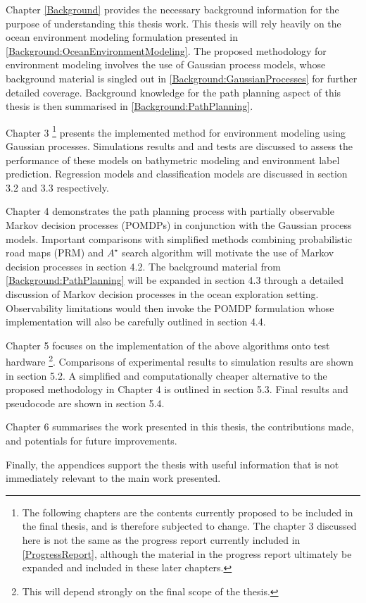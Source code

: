 		Chapter \ref{Background} provides the necessary background information for the purpose of understanding this thesis work. This thesis will rely heavily on the ocean environment modeling formulation presented in \cref{Background:OceanEnvironmentModeling}. The proposed methodology for environment modeling involves the use of Gaussian process models, whose background material is singled out in \cref{Background:GaussianProcesses} for further detailed coverage. Background knowledge for the path planning aspect of this thesis is then summarised in \cref{Background:PathPlanning}.
				
		Chapter {\color{BurntOrange} 3} \footnote{ {\color{BurntOrange} The following chapters are the contents currently proposed to be included in the final thesis, and is therefore subjected to change. The chapter 3 discussed here is not the same as the progress report currently included in \cref{ProgressReport}, although the material in the progress report ultimately be expanded and included in these later chapters.} } presents the implemented method for environment modeling using Gaussian processes. Simulations results and and tests are discussed to assess the performance of these models on bathymetric modeling and environment label prediction. Regression models and classification models are discussed in section {\color{BurntOrange} 3.2} and {\color{BurntOrange} 3.3} respectively.
		
		Chapter {\color{BurntOrange} 4} demonstrates the path planning process with partially observable Markov decision processes (POMDPs) in conjunction with the Gaussian process models. Important comparisons with simplified methods combining probabilistic road maps (PRM) and $A^{\star}$ search algorithm will motivate the use of Markov decision processes in section {\color{BurntOrange} 4.2}. The background material from \cref{Background:PathPlanning} will be expanded in section {\color{BurntOrange} 4.3} through a detailed discussion of Markov decision processes in the ocean exploration setting. Observability limitations would then invoke the POMDP formulation whose implementation will also be carefully outlined in section {\color{BurntOrange} 4.4}.
		
		Chapter {\color{BurntOrange} 5} focuses on the implementation of the above algorithms onto test hardware \footnote{ {\color{BurntOrange} This will depend strongly on the final scope of the thesis.} }. Comparisons of experimental results to simulation results are shown in section {\color{BurntOrange} 5.2}. A simplified and computationally cheaper alternative to the proposed methodology in Chapter {\color{BurntOrange} 4} is outlined in section {\color{BurntOrange} 5.3}. Final results and pseudocode are shown in section {\color{BurntOrange} 5.4}.
		
		Chapter {\color{BurntOrange} 6} summarises the work presented in this thesis, the contributions made, and potentials for future improvements.
		
		Finally, the appendices support the thesis with useful information that is not immediately relevant to the main work presented.
		
		